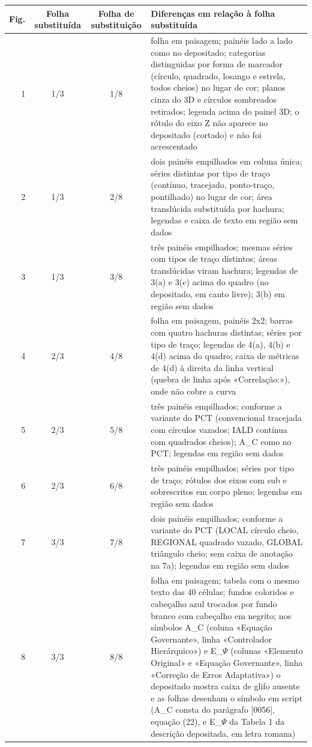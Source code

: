 \documentclass[a4paper,11pt]{article}
\begin{document}
{\small\begin{longtable}{|r|c|c|p{9.4cm}|}\hline \textbf{Fig.} & \textbf{Folha substituída} & \textbf{Folha de substituição} & \textbf{Diferenças em relação à folha substituída}\\\hline\endhead

1 & 1/3 & 1/8 & folha em paisagem; painéis lado a lado como no depositado; categorias distinguidas por forma de marcador (círculo, quadrado, losango e estrela, todos cheios) no lugar de cor; planos cinza do 3D e círculos sombreados retirados; legenda acima do painel 3D; o rótulo do eixo Z não aparece no depositado (cortado) e não foi acrescentado\\\hline

2 & 1/3 & 2/8 & dois painéis empilhados em coluna única; séries distintas por tipo de traço (contínuo, tracejado, ponto-traço, pontilhado) no lugar de cor; área translúcida substituída por hachura; legendas e caixa de texto em região sem dados\\\hline

3 & 1/3 & 3/8 & três painéis empilhados; mesmas séries com tipos de traço distintos; áreas translúcidas viram hachura; legendas de 3(a) e 3(c) acima do quadro (no depositado, em canto livre); 3(b) em região sem dados\\\hline

4 & 2/3 & 4/8 & folha em paisagem, painéis 2x2; barras com quatro hachuras distintas; séries por tipo de traço; legendas de 4(a), 4(b) e 4(d) acima do quadro; caixa de métricas de 4(d) à direita da linha vertical (quebra de linha após «Correlação:»), onde não cobre a curva\\\hline

5 & 2/3 & 5/8 & três painéis empilhados; conforme a variante do PCT (convencional tracejada com círculos vazados; IALD contínua com quadrados cheios); A\_C como no PCT; legendas em região sem dados\\\hline

6 & 2/3 & 6/8 & três painéis empilhados; séries por tipo de traço; rótulos dos eixos com sub e sobrescritos em corpo pleno; legendas em região sem dados\\\hline

7 & 3/3 & 7/8 & dois painéis empilhados; conforme a variante do PCT (LOCAL círculo cheio, REGIONAL quadrado vazado, GLOBAL triângulo cheio; sem caixa de anotação na 7a); legendas em região sem dados\\\hline

8 & 3/3 & 8/8 & folha em paisagem; tabela com o mesmo texto das 40 células; fundos coloridos e cabeçalho azul trocados por fundo branco com cabeçalho em negrito; nos símbolos A\_C (coluna «Equação Governante», linha «Controlador Hierárquico») e E\_$\Psi$ (colunas «Elemento Original» e «Equação Governante», linha «Correção de Erros Adaptativa») o depositado mostra caixa de glifo ausente e as folhas desenham o símbolo em script (A\_C consta do parágrafo [0056], equação (22), e E\_$\Psi$ da Tabela 1 da descrição depositada, em letra romana)\\\hline

\end{longtable}}
\end{document}
